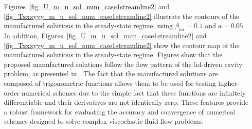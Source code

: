 \documentclass[preprint, 12pt]{elsarticle}
\begin{document}
Figures~\ref{fig_U_m_u_sol_num_case1streamline2} and
\ref{fig_Txxxyyy_m_u_sol_num_case1streamline2} illustrate the contours of the
manufactured solutions in the steady-state regime, using $\beta_{nn}=0.1$ and
$a = 0.05$. In addition, Figures~\ref{fig_U_m_u_sol_num_case1streamline2} and
\ref{fig_Txxxyyy_m_u_sol_num_case1streamline2} show the contour map of the
manufactured solutions in the steady-state regime. Figures show that the
proposed manufactured solutions follow the flow pattern of the lid-driven
cavity problem, as presented in \citet{bruneau20062d}. The fact that the
manufactured solutions are composed of trigonometric functions allows them to
be used for testing higher-order numerical schemes due to the simple fact that
these functions are infinitely differentiable and their derivatives are not
identically zero. These features provide a robust framework for evaluating the
accuracy and convergence of numerical schemes designed to solve complex
viscoelastic fluid flow problems.
\end{document}
